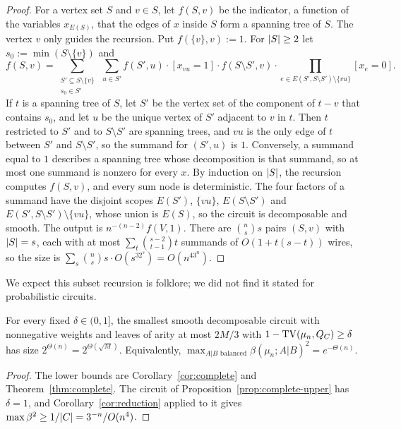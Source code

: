 \begin{proof}
For a vertex set $S$ and $v\in S$, let $f(S,v)$ be the indicator, a function of the variables $x_{E(S)}$, that the edges of $x$ inside $S$ form a spanning tree of $S$. The vertex $v$ only guides the recursion. Put $f(\{v\},v):=1$. For $\lvert S\rvert\ge2$ let $s_0:=\min(S\setminus\{v\})$ and
\[
  f(S,v)=\sum_{\substack{S'\subseteq S\setminus\{v\}\\ s_0\in S'}}\ \sum_{u\in S'} f(S',u)\cdot[x_{vu}=1]\cdot f(S\setminus S',v)\cdot\prod_{e\in E(S',S\setminus S')\setminus\{vu\}}[x_e=0] .
\]
If $t$ is a spanning tree of $S$, let $S'$ be the vertex set of the component of $t-v$ that contains $s_0$, and let $u$ be the unique vertex of $S'$ adjacent to $v$ in $t$. Then $t$ restricted to $S'$ and to $S\setminus S'$ are spanning trees, and $vu$ is the only edge of $t$ between $S'$ and $S\setminus S'$, so the summand for $(S',u)$ is $1$. Conversely, a summand equal to $1$ describes a spanning tree whose decomposition is that summand, so at most one summand is nonzero for every $x$. By induction on $\lvert S\rvert$, the recursion computes $f(S,v)$, and every sum node is deterministic. The four factors of a summand have the disjoint scopes $E(S')$, $\{vu\}$, $E(S\setminus S')$ and $E(S',S\setminus S')\setminus\{vu\}$, whose union is $E(S)$, so the circuit is decomposable and smooth. The output is $n^{-(n-2)}f(V,1)$. There are $\binom ns s$ pairs $(S,v)$ with $\lvert S\rvert=s$, each with at most $\sum_t\binom{s-2}{t-1}t$ summands of $O(1+t(s-t))$ wires, so the size is $\sum_s\binom ns s\cdot O(s^32^s)=O(n^43^n)$.
\end{proof}

We expect this subset recursion is folklore; we did not find it stated for probabilistic circuits.

\begin{corollary}\label{cor:complete-order}
For every fixed $\delta\in(0,1]$, the smallest smooth decomposable circuit with nonnegative weights and leaves of arity at most $2M/3$ with $1-\mathrm{TV}(\mu_n,Q_C)\ge\delta$ has size $2^{\Theta(n)}=2^{\Theta(\sqrt M)}$. Equivalently, $\max_{A|B\text{ balanced}}\beta(\mu_n;A|B)^2=e^{-\Theta(n)}$.
\end{corollary}

\begin{proof}
The lower bounds are Corollary~\ref{cor:complete} and Theorem~\ref{thm:complete}. The circuit of Proposition~\ref{prop:complete-upper} has $\delta=1$, and Corollary~\ref{cor:reduction} applied to it gives $\max\beta^2\ge1/\lvert C\rvert=3^{-n}/O(n^4)$.
\end{proof}
